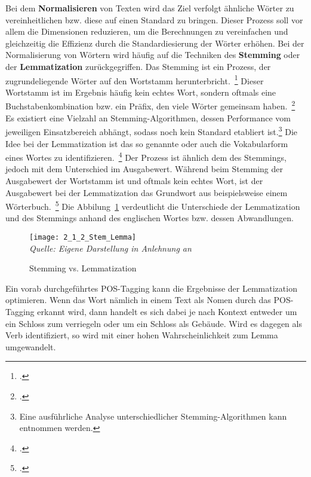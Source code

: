 Bei dem \textbf{Normalisieren} von Texten wird das Ziel verfolgt ähnliche Wörter zu vereinheitlichen bzw.
diese auf einen Standard zu bringen.
Dieser Prozess soll vor allem die Dimensionen reduzieren, um die Berechnungen zu vereinfachen und gleichzeitig die
Effizienz durch die Standardiesierung der Wörter erhöhen.
\newline
Bei der Normalisierung von Wörtern wird häufig auf die Techniken des \textbf{Stemming} oder der \textbf{Lemmatization}
zurückgegriffen.
Das Stemming ist ein Prozess, der zugrundeliegende Wörter auf den Wortstamm herunterbricht.~\footcite[\vglf][]
{khyani.2021}
Dieser Wortstamm ist im Ergebnis häufig kein echtes Wort, sondern oftmals eine Buchstabenkombination bzw.
ein Präfix, den viele Wörter gemeinsam haben.~\footcite[\vglf][]{khyani.2021}
Es existiert eine Vielzahl an Stemming-Algorithmen, dessen Performance vom jeweiligen Einsatzbereich abhängt, sodass
noch kein Standard etabliert ist.\footnote{Eine ausführliche Analyse unterschiedlicher Stemming-Algorithmen kann{}
\cite{jivani.2011} entnommen werden.}
\newline
Die Idee bei der Lemmatization ist das so genannte \grqq{} oder auch die Vokabularform eines Wortes
zu identifizieren.~\footcite[\vglf][]{khyani.2021}
Der Prozess ist ähnlich dem des Stemmings, jedoch mit dem Unterschied im Ausgabewert.
Während beim Stemming der Ausgabewert der Wortstamm ist und oftmals kein echtes Wort,
ist der Ausgabewert bei der Lemmatization das Grundwort aus beispielsweise einem Wörterbuch.~\footcite[\vglf]
[]{khyani.2021}
Die Abbilung~\ref{fig:2_1_2_Stem_Lemma} verdeutlicht die Unterschiede der Lemmatization und des Stemmings anhand
des englischen Wortes \grqq{} bzw.
dessen Abwandlungen.

\begin{figure}[H]
    \caption{Stemming vs. Lemmatization}\label{fig:2_1_2_Stem_Lemma}
    \texttt{[image: 2\_1\_2\_Stem\_Lemma]}
    \\
    \textit{Quelle: Eigene Darstellung in Anlehnung an}~\cite[]{khyani.2021}
\end{figure}
Ein vorab durchgeführtes \ac{POS}-Tagging kann die Ergebnisse der Lemmatization optimieren.
Wenn das Wort \grqq{} nämlich in einem Text als Nomen durch das \ac{POS}-Tagging erkannt wird,
dann handelt es sich dabei je nach Kontext entweder um ein Schloss zum verriegeln oder um ein Schloss als Gebäude.
Wird es dagegen als Verb identifiziert, so wird mit einer hohen Wahrscheinlichkeit zum Lemma \qrqq{}
umgewandelt.

